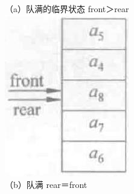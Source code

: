 \documentclass[10pt]{article}
\begin{document}
（a）队满的临界状态 front＞rear\\
\includegraphics[max width=\textwidth, center]{2025_06_06_704745ea57b15b2333e5g-094(1)}\\
（b）队满 rear＝front\\
\end{document}
